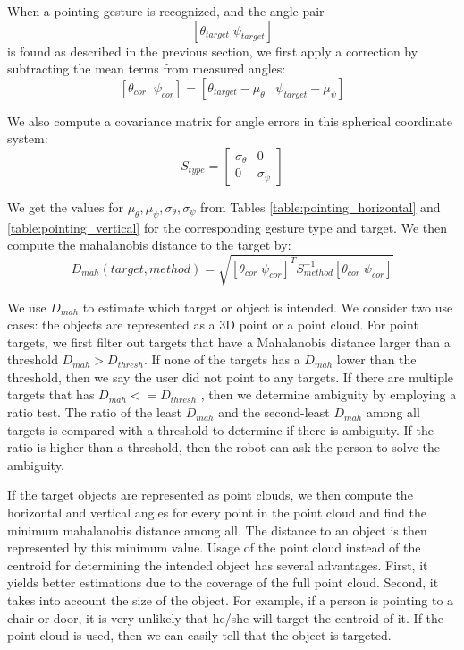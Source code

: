 When a pointing gesture is recognized, and the angle pair $$[\theta_{target}\;\psi_{target}]$$ is found as described in the previous section, we first apply a correction by subtracting the mean terms from measured angles:
$$[\theta_{cor}\;\;\psi_{cor}]=[\theta_{target}-\mu_{\theta}\;\;\;\psi_{target}-\mu_{\psi}]$$
 
We also compute a covariance matrix for angle errors in this spherical coordinate system: 
$$S_{type} = \begin{bmatrix}
\sigma_{\theta}&0\\ 0&\sigma_{\psi}
\end{bmatrix} $$

We get the values for $\mu_{\theta}, \mu_{\psi}, \sigma_{\theta} ,\sigma_{\psi}$ from Tables \ref{table:pointing_horizontal} and \ref{table:pointing_vertical} for the corresponding gesture type and target. We then compute the mahalanobis distance to the target by:
$$D_{mah}(target,method)=\sqrt{ [\theta_{cor}\;\psi_{cor}]^T S_{method}^{-1} [\theta_{cor}\;\psi_{cor}]}$$
 
We use $D_{mah}$ to estimate which target or object is intended. We consider two use cases: the objects are represented as a 3D point or a point cloud. For point targets, we first filter out targets that have a Mahalanobis distance larger than a threshold $D_{mah} > D_{thresh}$. If none of the targets has a $D_{mah}$ lower than the threshold, then we say the user did not point to any targets. If there are multiple targets that has $D_{mah} <= D_{thresh}$ , then we determine ambiguity by employing a ratio test. The ratio of the least $D_{mah}$ and the second-least $D_{mah}$ among all targets is compared with a threshold to determine if there is ambiguity. If the ratio is higher than a threshold, then the robot can ask the person to solve the ambiguity.

If the target objects are represented as point clouds, we then compute the horizontal and vertical angles for every point in the point cloud and find the minimum mahalanobis distance among all. The distance to an object is then represented by this minimum value. Usage of the point cloud instead of the centroid for determining the intended object has several advantages. First, it yields better estimations due to the coverage of the full point cloud. Second, it takes into account the size of the object. For example, if a person is pointing to a chair or door, it is very unlikely that he/she will target the centroid of it. If the point cloud is used, then we can easily tell that the object is targeted.

